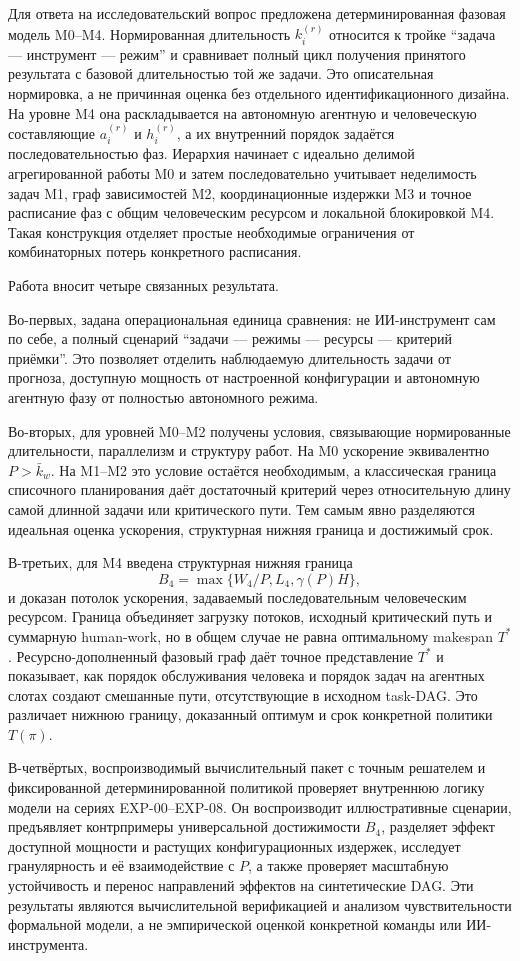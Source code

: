 Для ответа на исследовательский вопрос предложена детерминированная фазовая
модель M0--M4. Нормированная длительность $k_i^{(r)}$ относится к тройке
``задача --- инструмент --- режим'' и сравнивает полный цикл получения
принятого результата с базовой длительностью той же задачи. Это описательная
нормировка, а не причинная оценка без отдельного идентификационного дизайна. На
уровне M4 она раскладывается на автономную агентную и человеческую составляющие
$a_i^{(r)}$ и $h_i^{(r)}$, а их внутренний порядок задаётся последовательностью
фаз. Иерархия начинает с идеально делимой агрегированной работы M0 и затем
последовательно учитывает неделимость задач M1, граф зависимостей M2,
координационные издержки M3 и точное расписание фаз с общим человеческим
ресурсом и локальной блокировкой M4. Такая конструкция отделяет простые
необходимые ограничения от комбинаторных потерь конкретного расписания.

Работа вносит четыре связанных результата.

Во-первых, задана операциональная единица сравнения: не ИИ-инструмент сам по
себе, а полный сценарий ``задачи --- режимы --- ресурсы --- критерий приёмки''.
Это позволяет отделить наблюдаемую длительность задачи от прогноза, доступную
мощность от настроенной конфигурации и автономную агентную фазу от полностью
автономного режима.

Во-вторых, для уровней M0--M2 получены условия, связывающие нормированные
длительности, параллелизм и структуру работ. На M0 ускорение эквивалентно
$P>\bar{k}_w$. На M1--M2 это условие остаётся необходимым, а классическая
граница списочного планирования даёт достаточный критерий через относительную
длину самой длинной задачи или критического пути. Тем самым явно разделяются
идеальная оценка ускорения, структурная нижняя граница и достижимый срок.

В-третьих, для M4 введена структурная нижняя граница
\[
  B_4=\max\{W_4/P,L_4,\gamma(P)H\},
\]
и доказан потолок ускорения, задаваемый последовательным человеческим
ресурсом. Граница объединяет загрузку потоков,
исходный критический путь и суммарную human-work, но в общем случае не равна
оптимальному makespan $T^*$. Ресурсно-дополненный фазовый граф даёт точное
представление $T^*$ и показывает, как порядок обслуживания человека и порядок
задач на агентных слотах создают смешанные пути, отсутствующие в исходном
task-DAG. Это различает нижнюю границу, доказанный оптимум и срок конкретной
политики $T(\pi)$.

В-четвёртых, воспроизводимый вычислительный пакет с точным решателем и
фиксированной детерминированной политикой проверяет внутреннюю логику модели на
сериях EXP-00--EXP-08. Он воспроизводит иллюстративные сценарии, предъявляет
контрпримеры универсальной достижимости $B_4$, разделяет эффект доступной
мощности и растущих конфигурационных издержек, исследует гранулярность и её
взаимодействие с $P$, а также проверяет масштабную устойчивость и перенос
направлений эффектов на синтетические DAG. Эти результаты являются
вычислительной верификацией и анализом чувствительности формальной модели, а не
эмпирической оценкой конкретной команды или ИИ-инструмента.

